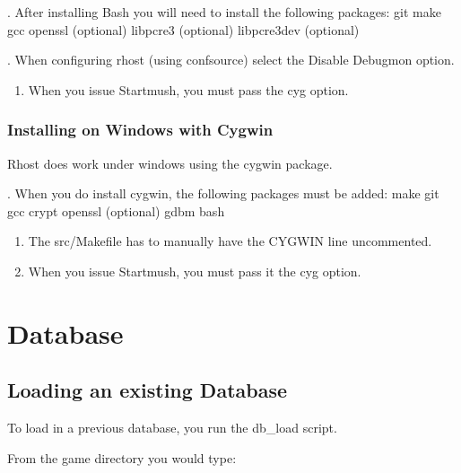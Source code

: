 \documentclass[letterpaper,10pt,english]{sphinxmanual}
\begin{document}
. After installing Bash you will need to install the following packages:
git
make
gcc
openssl (optional)
libpcre3 (optional)
libpcre3\sphinxhyphen{}dev (optional)

. When configuring rhost (using confsource) select the Disable Debugmon
option.
\begin{enumerate}
%
\setcounter{enumi}{2}
\item {} 
\sphinxAtStartPar
When you issue Startmush, you must pass the \sphinxhyphen{}cyg option.

\end{enumerate}


\subsubsection{Installing on Windows with Cygwin}
\label{\detokenize{installation:installing-on-windows-with-cygwin}}
\sphinxAtStartPar
Rhost does work under windows using the cygwin package.

.  When you do install cygwin, the following packages must be added:
make
git
gcc
crypt
openssl (optional)
gdbm
bash
\begin{enumerate}
%
\setcounter{enumi}{1}
\item {} 
\sphinxAtStartPar
The src/Makefile has to manually have the CYGWIN line uncommented.

\item {} 
\sphinxAtStartPar
When you issue Startmush, you must pass it the \sphinxhyphen{}cyg option.

\end{enumerate}


\section{Database}
\label{\detokenize{database:database}}\label{\detokenize{database::doc}}

\subsection{Loading an existing Database}
\label{\detokenize{database:loading-an-existing-database}}
\sphinxAtStartPar
To load in a previous database, you run the db\_load script.

\sphinxAtStartPar
From the game directory you would type:
\end{document}
